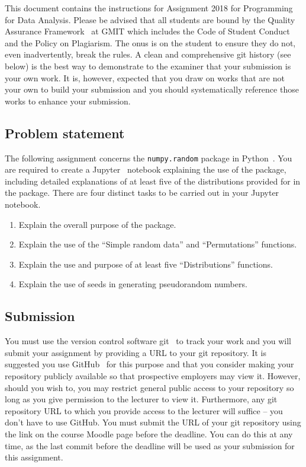 \documentclass[12pt, a4paper, hidelinks]{scrartcl}
\title{\projectname}
\author{\modulename}
\date{Due: \duedate}
\newcommand{\modulename}{Programming for Data Analysis}
\newcommand{\projectyear}{2018}
\newcommand{\projectname}{Assignment \projectyear}
\begin{document}
  
\maketitle

\noindent
This document contains the instructions for \projectname{} for \modulename{}.
Please be advised that all students are bound by the Quality Assurance Framework~\cite{gmitqaf} at GMIT which includes the Code of Student Conduct and the Policy on Plagiarism.
The onus is on the student to ensure they do not, even inadvertently, break the rules.
A clean and comprehensive git history (see below) is the best way to demonstrate to the examiner that your submission is your own work.
It is, however, expected that you draw on works that are not your own to build your submission and you should systematically reference those works to enhance your submission.


\subsection*{Problem statement}
  The following assignment concerns the \texttt{numpy.random} package in Python~\cite{numpy}.
  You are required to create a Jupyter~\cite{jupyter} notebook explaining the use of the package, including detailed explanations of at least five of the distributions provided for in the package.
  There are four distinct tasks to be carried out in your Jupyter notebook.

  \begin{enumerate}
    \item Explain the overall purpose of the package.
    \item Explain the use of the ``Simple random data'' and ``Permutations'' functions.
    \item Explain the use and purpose of at least five ``Distributions'' functions.
    \item Explain the use of seeds in generating pseudorandom numbers. 
  \end{enumerate}

\subsection*{Submission}
  You must use the version control software git~\cite{git} to track your work and you will submit your assignment by providing a URL to your git repository.
  It is suggested you use GitHub~\cite{github} for this purpose and that you consider making your repository publicly available so that prospective employers may view it.
  However, should you wish to, you may restrict general public access to your repository so long as you give permission to the lecturer to view it.
  Furthermore, any git repository URL to which you provide access to the lecturer will suffice -- you don't have to use GitHub.  
  You must submit the URL of your git repository using the link on the course Moodle page before the deadline.
  You can do this at any time, as the last commit before the deadline will be used as your submission for this assignment.
\end{document}
